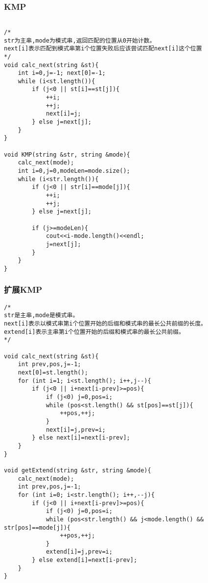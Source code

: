 \subsubsection{KMP}
\begin{verbatim}

/*
str为主串,mode为模式串,返回匹配的位置从0开始计数。
next[i]表示匹配到模式串第i个位置失败后应该尝试匹配next[i]这个位置
*/
void calc_next(string &st){
    int i=0,j=-1; next[0]=-1;
    while (i<st.length()){
        if (j<0 || st[i]==st[j]){
            ++i;
            ++j;
            next[i]=j;
        } else j=next[j];
    }
}

void KMP(string &str, string &mode){
    calc_next(mode);
    int i=0,j=0,modeLen=mode.size();
    while (i<str.length()){
        if (j<0 || str[i]==mode[j]){
            ++i;
            ++j;
        } else j=next[j];

        if (j>=modeLen){
            cout<<i-mode.length()<<endl;
            j=next[j];
        }
    }
}
\end{verbatim}

\subsubsection{扩展KMP}
\begin{verbatim}
/*
str是主串,mode是模式串。
next[i]表示以模式串第i个位置开始的后缀和模式串的最长公共前缀的长度。
extend[i]表示主串第i个位置开始的后缀和模式串的最长公共前缀。
*/

void calc_next(string &st){
    int prev,pos,j=-1;
    next[0]=st.length();
    for (int i=1; i<st.length(); i++,j--){
        if (j<0 || i+next[i-prev]>=pos){
            if (j<0) j=0,pos=i;
            while (pos<st.length() && st[pos]==st[j]){
                ++pos,++j;
            }
            next[i]=j,prev=i;
        } else next[i]=next[i-prev];
    }
}

void getExtend(string &str, string &mode){
    calc_next(mode);
    int prev,pos,j=-1;
    for (int i=0; i<str.length(); i++,--j){
        if (j<0 || i+next[i-prev]>=pos){
            if (j<0) j=0,pos=i;
            while (pos<str.length() && j<mode.length() && str[pos]==mode[j]){
                ++pos,++j;
            }
            extend[i]=j,prev=i;
        } else extend[i]=next[i-prev];
    }
}
\end{verbatim}
